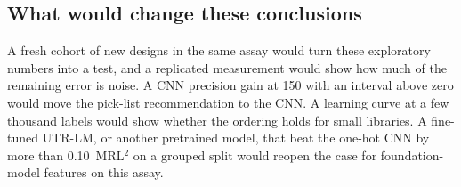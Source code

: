 \documentclass[11pt]{article}
\begin{document}
\subsection{What would change these conclusions}
A fresh cohort of new designs in the same assay would turn these exploratory numbers into a test, and a replicated
measurement would show how much of the remaining error is noise. A CNN precision gain at 150 with an interval above zero
would move the pick-list recommendation to the CNN. A learning curve at a few thousand labels would show whether the
ordering holds for small libraries. A fine-tuned UTR-LM, or another pretrained model, that beat the one-hot CNN by more
than 0.10~MRL$^2$ on a grouped split would reopen the case for foundation-model features on this assay.

\end{document}

